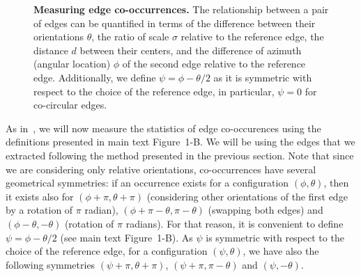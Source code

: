 \documentclass[a4paper]{article}
\begin{document}
\begin{figure}
{
} 
\vspace*{-5cm} 
\caption{ 
{\bf Measuring edge co-occurrences.} 
The relationship between a pair of edges can be quantified 
in terms of the difference between their orientations $\theta$, 
the ratio of scale $\sigma$ relative to the reference edge, 
the distance $d$ between their centers, 
and the difference of azimuth (angular location) $\phi$ 
of the second edge relative to the reference edge. 
Additionally, we define $\psi=\phi - \theta/2$ as it is
symmetric with respect to the choice of the reference edge, 
in particular, $\psi=0$ for co-circular edges.\label{fig:angles} %
 } %
\end{figure} %
As in~\citet{Geisler01}, 
we will now measure the statistics of edge co-occurences 
using the definitions presented in main text Figure~1-B. 
We will be using the edges that we extracted 
following the method presented in the previous section. 
Note that since we are considering only relative orientations, 
co-occurrences have several geometrical symmetries: %
if an occurrence exists for a configuration $(\phi, \theta)$, then it exists also for 
$(\phi+\pi, \theta+\pi)$ (considering other orientations of the first edge by a rotation of $\pi$ radian),
$(\phi+\pi-\theta, \pi-\theta)$ (swapping both edges) and 
$(\phi-\theta, -\theta)$ (rotation of $\pi$ radians). 
For that reason, it is convenient to define $\psi=\phi - \theta/2$ (see main text Figure~1-B).
As $\psi$ is symmetric with respect to the choice of the reference
edge, for a configuration $(\psi, \theta)$, we have also the following
symmetries $(\psi+\pi, \theta+\pi)$, $(\psi+\pi, \pi-\theta)$ and
$(\psi, -\theta)$.
\end{document}

